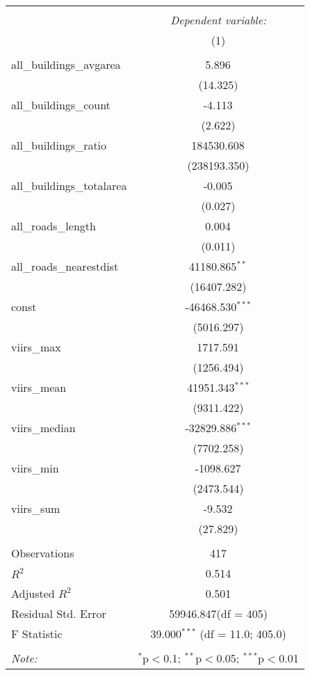 \begin{table}[!htbp] \centering
\begin{tabular}{@{\extracolsep{5pt}}lc}
\\[-1.8ex]\hline
\hline \\[-1.8ex]
& \multicolumn{1}{c}{\textit{Dependent variable:}} \
\cr \cline{1-2}
\\[-1.8ex] & (1) \\
\hline \\[-1.8ex]
 all_buildings_avgarea & 5.896$^{}$ \\
  & (14.325) \\
 all_buildings_count & -4.113$^{}$ \\
  & (2.622) \\
 all_buildings_ratio & 184530.608$^{}$ \\
  & (238193.350) \\
 all_buildings_totalarea & -0.005$^{}$ \\
  & (0.027) \\
 all_roads_length & 0.004$^{}$ \\
  & (0.011) \\
 all_roads_nearestdist & 41180.865$^{**}$ \\
  & (16407.282) \\
 const & -46468.530$^{***}$ \\
  & (5016.297) \\
 viirs_max & 1717.591$^{}$ \\
  & (1256.494) \\
 viirs_mean & 41951.343$^{***}$ \\
  & (9311.422) \\
 viirs_median & -32829.886$^{***}$ \\
  & (7702.258) \\
 viirs_min & -1098.627$^{}$ \\
  & (2473.544) \\
 viirs_sum & -9.532$^{}$ \\
  & (27.829) \\
\hline \\[-1.8ex]
 Observations & 417 \\
 $R^2$ & 0.514 \\
 Adjusted $R^2$ & 0.501 \\
 Residual Std. Error & 59946.847(df = 405)  \\
 F Statistic & 39.000$^{***}$ (df = 11.0; 405.0) \\
\hline
\hline \\[-1.8ex]
\textit{Note:} & \multicolumn{1}{r}{$^{*}$p$<$0.1; $^{**}$p$<$0.05; $^{***}$p$<$0.01} \\
\end{tabular}
\end{table}